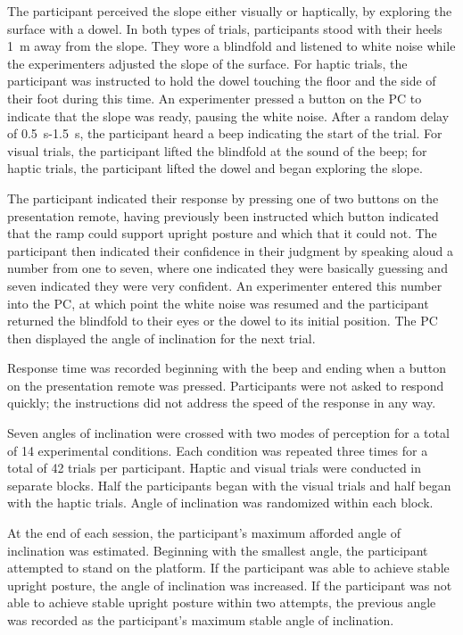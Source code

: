 \documentclass{article}
\begin{document}
The participant perceived the slope either visually or haptically, by exploring the surface with a dowel. In both types of trials, participants stood with their heels 1~m away from the slope. They wore a blindfold and listened to white noise while the experimenters adjusted the slope of the surface. For haptic trials, the participant was instructed to hold the dowel touching the floor and the side of their foot during this time. An experimenter pressed a button on the PC to indicate that the slope was ready, pausing the white noise. After a random delay of 0.5~s-1.5~s, the participant heard a beep indicating the start of the trial. For visual trials, the participant lifted the blindfold at the sound of the beep; for haptic trials, the participant lifted the dowel and began exploring the slope.

The participant indicated their response by pressing one of two buttons on the presentation remote, having previously been instructed which button indicated that the ramp could support upright posture and which that it could not. The participant then indicated their confidence in their judgment by speaking aloud a number from one to seven, where one indicated they were basically guessing and seven indicated they were very confident. An experimenter entered this number into the PC, at which point the white noise was resumed and the participant returned the blindfold to their eyes or the dowel to its initial position. The PC then displayed the angle of inclination for the next trial.

Response time was recorded beginning with the beep and ending when a button on the presentation remote was pressed. Participants were not asked to respond quickly; the instructions did not address the speed of the response in any way.

Seven angles of inclination were crossed with two modes of perception for a total of 14 experimental conditions. Each condition was repeated three times for a total of 42 trials per participant. Haptic and visual trials were conducted in separate blocks. Half the participants began with the visual trials and half began with the haptic trials. Angle of inclination was randomized within each block.

At the end of each session, the participant's maximum afforded angle of inclination was estimated. Beginning with the smallest angle, the participant attempted to stand on the platform. If the participant was able to achieve stable upright posture, the angle of inclination was increased. If the participant was not able to achieve stable upright posture within two attempts, the previous angle was recorded as the participant's maximum stable angle of inclination.
\end{document}
